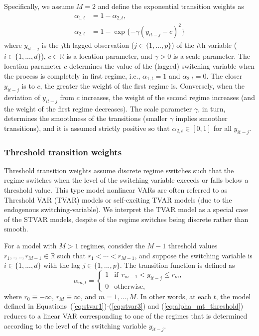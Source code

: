 \documentclass[nojss]{jss}
\begin{document}
Specifically, we assume $M=2$ and define the exponential transition weights as
\begin{align}
\alpha_{1,t} &= 1 - \alpha_{2,t},\\
\alpha_{2,t} &= 1 - \exp\lbrace -\gamma(y_{it-j} - c)^2\rbrace
\end{align}
where $y_{it-j}$ is the $j$th lagged observation ($j\in \lbrace 1,...,p \rbrace$) of the $i$th variable ($i\in \lbrace 1,...,d \rbrace$), $c\in\mathbb{R}$ is a location parameter, and $\gamma > 0$ is a scale parameter. The location parameter $c$ determines the value of the (lagged) switching variable when the process is completely in first regime, i.e., $\alpha_{1,t}=1$ and $\alpha_{2,t}=0$. The closer $y_{it-j}$ is to $c$, the greater the weight of the first regime is. Conversely, when the deviation of $y_{it-j}$ from $c$ increases, the weight of the second regime increases (and the weight of the first regime decreases). The scale parameter $\gamma$, in turn, determines the smoothness of the transitions (smaller $\gamma$ implies smoother transitions), and it is assumed strictly positive so that $\alpha_{2,t}\in[0,1]$ for all $y_{it-j}$.

\subsubsection{Threshold transition weights}

Threshold transition weights assume discrete regime switches such that the regime switches when the level of the switching variable exceeds or falls below a threshold value. This type model nonlinear VARs are often referred to as Threshold VAR (TVAR) models \citep{Tsay:1998} or self-exciting TVAR models (due to the endogenous switching-variable). We interpret the TVAR model as a special case of the STVAR models, despite of the regime switches being discrete rather than smooth.

For a model with $M>1$ regimes, consider the $M-1$ threshold values $r_1,.,..,r_{M - 1}\in\mathbb{R}$ such that $r_1<\cdots<r_{M-1}$, and suppose the switching variable is $i\in \lbrace 1,...,d \rbrace$ with the lag $j\in \lbrace 1,...,p \rbrace$. The transition function is defined as
\begin{equation}\label{eq:alpha_mt_threshold}
\alpha_{m,t} =
\left\lbrace\begin{matrix}
1 & \text{if} \ \ r_{m-1} < y_{it-j} \leq r_{m}, \\
0 & \text{otherwise}, \phantom{aaaaaaaaa}
\end{matrix}\right.
\end{equation}
where $r_0\equiv-\infty$, $r_M\equiv\infty$, and $m=1,...,M$. In other words, at each $t$‚ the model defined in Equations~(\ref{eq:stvar1})-(\ref{eq:stvar3}) and (\ref{eq:alpha_mt_threshold}) reduces to a linear VAR corresponding to one of the regimes that is determined according to the level of the switching variable $y_{it-j}$.
\end{document}
